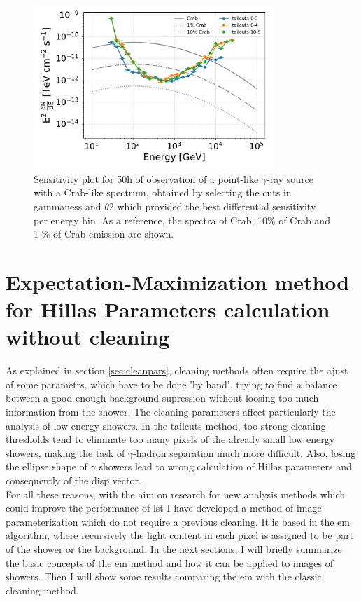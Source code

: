 \documentclass[main.tex]{subfiles}
\begin{document}
\begin{figure}
\centering
 \includegraphics[width=0.8\textwidth]{Pictures/sensitivity.pdf}
  \caption{Sensitivity plot for 50h of observation of a point-like $\gamma$-ray source with a Crab-like spectrum, obtained by selecting the cuts in gammaness and $\theta2$ which provided the best differential sensitivity per energy bin. As a reference, the spectra of Crab, 10\% of Crab and 1 \% of Crab emission are shown.}
    \label{fig:sens}
\end{figure}

\section[Expectation-Maximization method for Hillas Parameters...]{Expectation-Maximization method for Hillas Parameters calculation without cleaning} \label{sec:EM}

As explained in section \ref{sec:cleanpars}, cleaning methods often require the ajust of some parametrs, which have to be done 'by hand', trying to find a balance between a good enough background supression without loosing too much information from the shower. The cleaning parameters affect particularly the analysis of low energy showers. In the tailcuts method, too strong cleaning thresholds tend to eliminate too many pixels of the already small low energy showers, making the task of $\gamma$-hadron separation much more difficult. Also, losing the ellipse shape of $\gamma$ showers lead to wrong calculation of Hillas parameters and consequently of the disp vector.\\
For all these reasons, with the aim on research for new analysis methods which could improve the performance of \gls{lst} I have developed a method of image parameterization which do not require a previous cleaning. It is based in the \gls{em} algorithm, where recursively the light content in each pixel is assigned to be part of the shower or the background. In the next sections, I will briefly summarize the basic concepts of the \gls{em} method and how it can be applied to images of showers. Then I will show some results comparing the \gls{em} with the classic cleaning method. 
\end{document}
